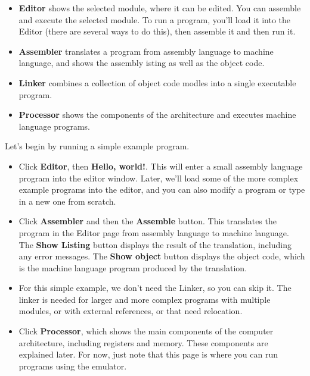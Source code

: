 \documentclass[11pt]{article}
\begin{document}
\begin{itemize}
\begin{itemize}
\item \textbf{\textbf{Editor}} shows the selected module, where it can be edited.  You
can assemble and execute the selected module.  To run a program,
you'll load it into the Editor (there are several ways to do this),
then assemble it and then run it.

\item \textbf{\textbf{Assembler}} translates a program from assembly language to machine
language, and shows the assembly isting as well as the object code.

\item \textbf{\textbf{Linker}} combines a collection of object code modles into a single
executable program.

\item \textbf{\textbf{Processor}} shows the components of the architecture and executes
machine language programs.
\end{itemize}

Let's begin by running a simple example program.

\begin{itemize}
\item Click \textbf{\textbf{Editor}}, then \textbf{\textbf{Hello, world!}}.  This will enter a small
assembly language program into the editor window.  Later, we'll load
some of the more complex example programs into the editor, and you
can also modify a program or type in a new one from scratch.

\item Click \textbf{\textbf{Assembler}} and then the \textbf{\textbf{Assemble}} button.  This
translates the program in the Editor page from assembly language to
machine language.  The \textbf{\textbf{Show Listing}} button displays the result
of the translation, including any error messages.  The \textbf{\textbf{Show
object}} button displays the object code, which is the machine
language program produced by the translation.

\item For this simple example, we don't need the Linker, so you can skip
it.  The linker is needed for larger and more complex programs with
multiple modules, or with external references, or that need
relocation.

\item Click \textbf{\textbf{Processor}}, which shows the main components of the computer
architecture, including registers and memory.  These components are
explained later.  For now, just note that this page is where you can
run programs using the emulator.


\end{itemize}
\end{itemize}
\end{document}
